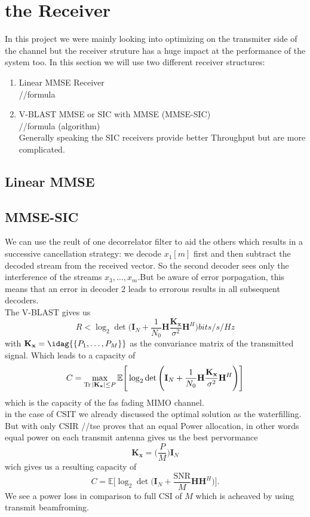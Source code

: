 \section{the Receiver}
In this project we were mainly looking into optimizing on the transmiter side of the channel but the receiver struture has a huge impact at the performance of the system too.
In this section we will use two different receiver structures:
\begin{enumerate}
	\item Linear MMSE Receiver\\
	//formula
	\item V-BLAST MMSE or SIC with MMSE (MMSE-SIC)\\
	//formula (algorithm)\\
	Generally speaking the SIC receivers provide better Throughput but are more complicated.
\end{enumerate}

\subsection{Linear MMSE}
\subsection{MMSE-SIC}
We can use the reult of one decorrelator filter to aid the others which results in a successive cancellation strategy: we decode $x_1[m]$ first and then subtract the decoded stream from the received vector. So the second decoder sees only the interference of the streams $x_3,\dots,x_m$.But be aware of error porpagation, this means that an error in decoder 2 leads to errorous results in all subsequent decoders.\\
The V-BLAST gives us
\begin{equation}
	R<\log_2{\det{\Biggr(\mathbf{I}_N+\frac{1}{N_0}\mathbf{H}\frac{\mathbf{K_x}}{\sigma^2}\mathbf{H}^H\Biggl)}} bits/s/Hz
\end{equation}
with $\mathbf{K_x} = \idag{\{P_1,\dots,P_M\}}$ as the convariance matrix of the transmitted signal. Which leads to a capacity of
\begin{equation}
	C = \max_{\operatorname*{Tr}{|\mathbf{K_x}|}\leq P}{\mathbb{E}\Biggr[\log_2{\det{\Biggr(\mathbf{I}_N+\frac{1}{N_0}\mathbf{H}\frac{\mathbf{K_x}}{\sigma^2}\mathbf{H}^H\Biggl)}}\Biggl]}
\end{equation}
which is the capacity of the fas fading MIMO channel.\\
in the case of CSIT we already discussed the optimal solution as the waterfilling. But with only CSIR //tse proves that an equal Power allocation, in other words equal power on each transmit antenna gives us the best pervormance
\begin{equation}
	\mathbf{K_x} = \Biggr(\frac{P}{M}\Biggl)\mathbf{I}_N
\end{equation}
wich gives us a resulting capacity of
\begin{equation}
	C = \mathbb{E}\Biggr[\log_2{\det{\Biggr(\mathbf{I}_N+\frac{
	\text{SNR}}{M}\mathbf{HH}^H\Biggl)}}\Biggl].
\end{equation}
We see a power loss in comparison to full CSI of $M$ which is acheaved by using transmit beamfroming.
